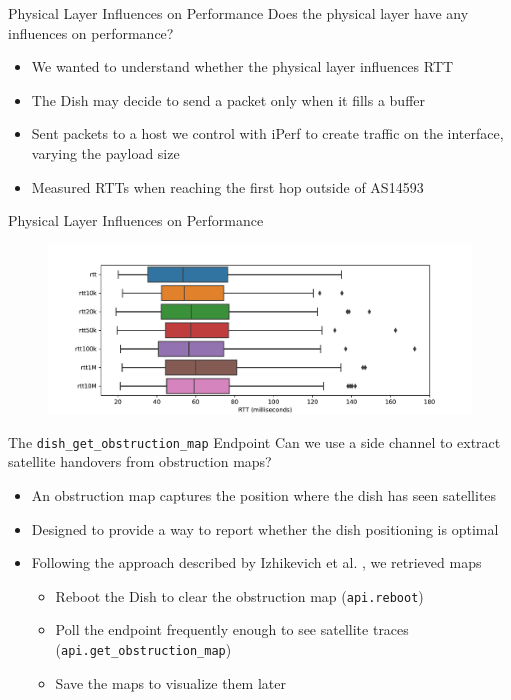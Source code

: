 \documentclass[NET,english,beameralt]{tumbeamer}
\begin{document}
\begin{frame}{Physical Layer Influences on Performance}
    Does the physical layer have any influences on performance? 
    \begin{itemize}
        \item We wanted to understand whether the physical layer influences RTT
        \item The Dish may decide to send a packet only when it fills a buffer
        \item Sent packets to a host we control with iPerf to create traffic on the interface, varying the payload size
        \item Measured RTTs when reaching the first hop outside of AS14593
    \end{itemize}
\end{frame}

\begin{frame}{{Physical Layer Influences on Performance}}
    \begin{figure}
        \includegraphics[width=1\textwidth]{pics/rtt-iperf-stress.pdf}
    \end{figure}
\end{frame}

\begin{frame}{The \texttt{dish\_get\_obstruction\_map} Endpoint}
    Can we use a side channel to extract satellite handovers from obstruction maps?
    \begin{itemize}
        \item An obstruction map captures the position where the dish has seen satellites
        \item Designed to provide a way to report whether the dish positioning is optimal
        \item Following the approach described by Izhikevich et al. \cite{izhikevich2023democratizing}, we retrieved maps
        \begin{itemize}
            \item Reboot the Dish to clear the obstruction map (\texttt{api.reboot})
            \item Poll the endpoint frequently enough to see satellite traces (\texttt{api.get\_obstruction\_map})
            \item Save the maps to visualize them later
        \end{itemize}
    \end{itemize}
\end{frame}
\end{document}
